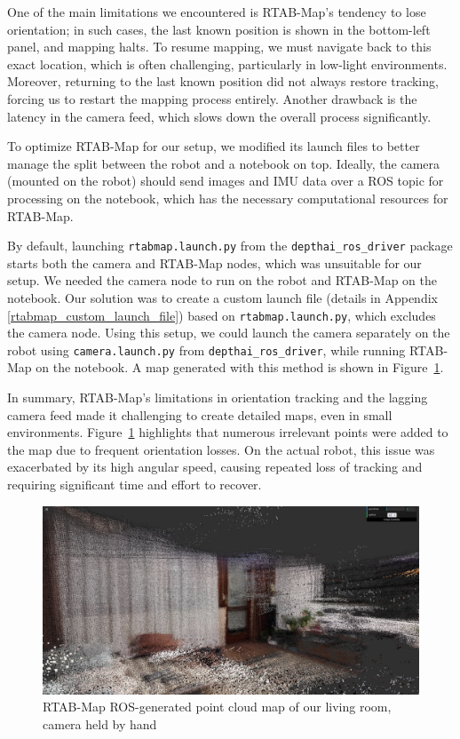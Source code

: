 One of the main limitations we encountered is RTAB-Map’s tendency to lose orientation; in such cases, the last known position is shown in the bottom-left panel, and mapping halts. To resume mapping, we must navigate back to this exact location, which is often challenging, particularly in low-light environments. Moreover, returning to the last known position did not always restore tracking, forcing us to restart the mapping process entirely. Another drawback is the latency in the camera feed, which slows down the overall process significantly.

To optimize RTAB-Map for our setup, we modified its launch files to better manage the split between the robot and a notebook on top. Ideally, the camera (mounted on the robot) should send images and IMU data over a ROS topic for processing on the notebook, which has the necessary computational resources for RTAB-Map.

By default, launching \verb|rtabmap.launch.py| from the \verb|depthai_ros_driver| package starts both the camera and RTAB-Map nodes, which was unsuitable for our setup. We needed the camera node to run on the robot and RTAB-Map on the notebook. Our solution was to create a custom launch file (details in Appendix \ref{rtabmap_custom_launch_file}) based on \verb|rtabmap.launch.py|, which excludes the camera node. Using this setup, we could launch the camera separately on the robot using \verb|camera.launch.py| from \verb|depthai_ros_driver|, while running RTAB-Map on the notebook. A map generated with this method is shown in Figure~\ref{fig:rtabmap_nokia}.

In summary, RTAB-Map’s limitations in orientation tracking and the lagging camera feed made it challenging to create detailed maps, even in small environments. Figure~\ref{fig:rtabmap_nokia} highlights that numerous irrelevant points were added to the map due to frequent orientation losses. On the actual robot, this issue was exacerbated by its high angular speed, causing repeated loss of tracking and requiring significant time and effort to recover.

\begin{figure}[htbp]
	\centering
	\includegraphics[width=150mm, keepaspectratio]{figures_jpg/rtabmap_ros_home.jpg}
	\caption{RTAB-Map ROS-generated point cloud map of our living room, camera held by hand}
	\label{fig:rtabmap_nokia}
\end{figure}

